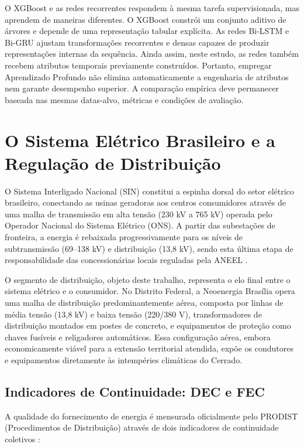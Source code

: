 O XGBoost e as redes recorrentes respondem à mesma tarefa supervisionada, mas aprendem de maneiras diferentes. O XGBoost constrói um conjunto aditivo de árvores e depende de uma representação tabular explícita. As redes Bi-LSTM e Bi-GRU ajustam transformações recorrentes e densas capazes de produzir representações internas da sequência. Ainda assim, neste estudo, as redes também recebem atributos temporais previamente construídos. Portanto, empregar Aprendizado Profundo não elimina automaticamente a engenharia de atributos nem garante desempenho superior. A comparação empírica deve permanecer baseada nas mesmas datas-alvo, métricas e condições de avaliação.

\section{O Sistema Elétrico Brasileiro e a Regulação de Distribuição}\label{sec:sistema_eletrico}

O Sistema Interligado Nacional (SIN) constitui a espinha dorsal do setor elétrico brasileiro, conectando as usinas geradoras aos centros consumidores através de uma malha de transmissão em alta tensão (230 kV a 765 kV) operada pelo Operador Nacional do Sistema Elétrico (ONS). A partir das subestações de fronteira, a energia é rebaixada progressivamente para os níveis de subtransmissão (69--138 kV) e distribuição (13,8 kV), sendo esta última etapa de responsabilidade das concessionárias locais reguladas pela ANEEL \cite{aneel2023prodist}.

O segmento de distribuição, objeto deste trabalho, representa o elo final entre o sistema elétrico e o consumidor. No Distrito Federal, a Neoenergia Brasília opera uma malha de distribuição predominantemente aérea, composta por linhas de média tensão (13,8 kV) e baixa tensão (220/380 V), transformadores de distribuição montados em postes de concreto, e equipamentos de proteção como chaves fusíveis e religadores automáticos. Essa configuração aérea, embora economicamente viável para a extensão territorial atendida, expõe os condutores e equipamentos diretamente às intempéries climáticas do Cerrado.

\subsection{Indicadores de Continuidade: DEC e FEC}

A qualidade do fornecimento de energia é mensurada oficialmente pelo PRODIST (Procedimentos de Distribuição) através de dois indicadores de continuidade coletivos \cite{aneel2023prodist}:


